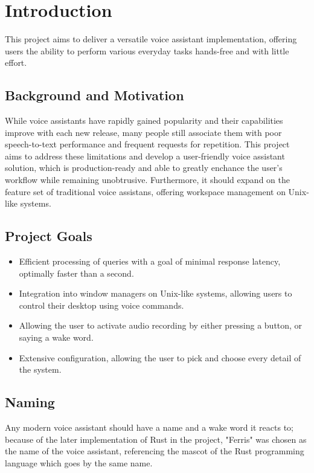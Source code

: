 \cleardoubleemptypage
\renewcommand*\chapterpagestyle{scrheadings}
\chapter{Introduction}

This project aims to deliver a versatile voice assistant implementation,
offering users the ability to perform various everyday tasks hands-free
and with little effort.

\section{Background and Motivation}
While voice assistants have rapidly gained popularity and their capabilities improve with each new release,
many people still associate them with poor speech-to-text performance and frequent requests for repetition.
This project aims to address these limitations and develop a user-friendly voice assistant solution,
which is production-ready and able to greatly enchance the user's workflow while remaining unobtrusive.
Furthermore, it should expand on the feature set of traditional voice assistans,
offering workspace management on Unix-like systems.

\section{Project Goals}
\begin{itemize}
  \item Efficient processing of queries with a goal of minimal response latency, optimally faster than a second.
  \item Integration into window managers on Unix-like systems, allowing users to control their desktop using voice commands.
  \item Allowing the user to activate audio recording by either pressing a button, or saying a wake word.
  \item Extensive configuration, allowing the user to pick and choose every detail of the system.
\end{itemize}

\section{Naming} \label{sec:naming}
Any modern voice assistant should have a name and a wake word it reacts to;
because of the later implementation of Rust in the project,
"Ferris" was chosen as the name of the voice assistant, referencing
the mascot of the Rust programming language which goes by the same name.
